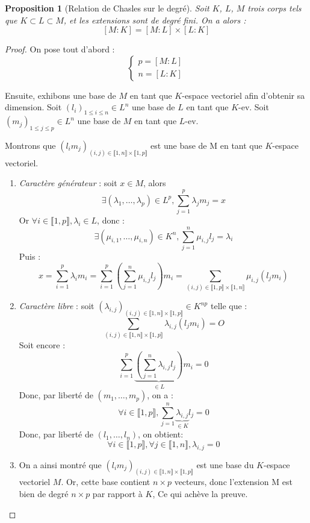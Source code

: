 \documentclass[a4paper,12pt,french]{report}
\newtheorem{proposition}{Proposition}[section]
\begin{document}
			\begin{proposition}[Relation de Chasles sur le degré]
				Soit \(K\), \(L\), \(M\) trois corps tels que \( K \subset L \subset M\), et les extensions sont de degré fini. On a alors :
				\[
				[M:K] = [M:L]{\times} [L:K]
				\]
			\end{proposition}
				\begin{proof}
					On pose tout d'abord :
					\[
					\left\{
						\begin{array}{ll}
							p = [M:L] \\
							n = [L:K]
						\end{array}
					\right.
					\]
					
					
					Ensuite, exhibons une base de \(M\) en tant que \(K\)-espace vectoriel afin d'obtenir sa dimension.
					Soit \((l_i)_{1 \leq i \leq n} \in L^n\) une base de \(L\) en tant que \(K\)-ev.
					Soit \((m_j)_{1 \leq j \leq p} \in L^n\) une base de \(M\) en tant que \(L\)-ev.
					
					Montrons que \((l_i m_j)_{(i, j) \in \llbracket 1, n \rrbracket \times \llbracket 1, p \rrbracket}\) est une base de M en tant que \(K\)-espace vectoriel.
					\begin{enumerate}
					\item \emph{Caractère générateur} : soit \(x \in M\), alors 
						\[
						\exists (\lambda_1, \dots, \lambda_p) \in L^p, \sum_{j  = 1}^{p} \lambda_j m_j = x
						\]
						Or \(\forall i \in \llbracket 1, p \rrbracket, \lambda_i \in L\), donc :
						\[ 
						\exists (\mu_{i, 1}, \dots, \mu_{i, n}) \in K^n, \sum_{j  = 1}^{n} \mu_{i, j} l_j = \lambda_i 
						\]
						Puis :
						\[
						x 	= \sum_{i  = 1}^{p} \lambda_i m_i  
							= \sum_{i  = 1}^{p} \left(\sum_{j  = 1}^{n} \mu_{i, j} l_j\right) m_i 
							= \sum_{(i, j) \in \llbracket 1, p \rrbracket \times \llbracket 1, n \rrbracket}\mu_{i, j} (l_j m_i)
						\]
					\item \emph{Caractère libre} : soit \((\lambda_{i, j})_{ (i, j) \in \llbracket 1, n \rrbracket \times \llbracket 1, p \rrbracket} \in K^{np}\) telle que :
							\[
							\sum_{(i, j) \in \llbracket 1, n \rrbracket \times \llbracket 1, p \rrbracket} \lambda_{i, j} (l_j m_i) = O
							\]
						Soit encore :
							\[
							\sum_{i=1}^{p} \underbrace{\left( \sum_{j = 1}^{n} \lambda_{i, j} l_j \right)}_{\in L}m_i = 0
							\]
						Donc, par liberté de \((m_1, \dots, m_p)\), on a :
							\[
							\forall i \in \llbracket 1, p \rrbracket, \sum_{j = 1}^{n} \underbrace{\lambda_{i, j}}_{\in K} l_j = 0
							\]
						Donc, par liberté de \((l_1, \dots, l_n)\), on obtient:
							\[
							\forall i \in \llbracket 1, p \rrbracket, \forall j \in \llbracket 1, n \rrbracket, \lambda_{i, j} = 0
							\]
					\item On a ainsi montré que \((l_i m_j)_{(i, j) \in \llbracket 1, n \rrbracket \times \llbracket 1, p \rrbracket}\) est une base du \(K\)-espace vectoriel \(M\). Or, cette base contient \(n\times p\) vecteurs, donc l'extension M est bien de degré \(n\times p\) par rapport à \(K\), Ce qui achève la preuve. \( \)
					
					\end{enumerate}
				\end{proof}
    
\end{document}
